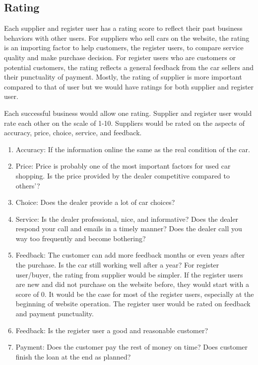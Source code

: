 \documentclass[12pt]{article}
\begin{document}
\subsection{Rating}
Each supplier and register user has a rating score to reflect their past business behaviors with other users. For suppliers who sell cars on the website, the rating is an importing factor to help customers, the register users, to compare service quality and make purchase decision. For register users who are customers or potential customers, the rating reflects a general feedback from the car sellers and their punctuality of payment. Mostly, the rating of supplier is more important compared to that of user but we would have ratings for both supplier and register user.\par
Each successful business would allow one rating. Supplier and register user would rate each other on the scale of 1-10. Suppliers would be rated on the aspects of accuracy, price, choice, service, and feedback.\par
\begin{enumerate}
\item Accuracy: If the information online the same as the real condition of the car.
\item Price: Price is probably one of the most important factors for used car shopping. Is the price provided by the dealer competitive compared to others'?
\item Choice: Does the dealer provide a lot of car choices?
\item Service: Is the dealer professional, nice, and informative? Does the dealer respond your call and emails in a timely manner? Does the dealer call you way too frequently and become bothering?
\item Feedback: The customer can add more feedback months or even years after the purchase. Is the car still working well after a year? For register user/buyer, the rating from supplier would be simpler. If the register users are new and did not purchase on the website before, they would start with a score of 0. It would be the case for most of the register users, especially at the beginning of website operation. The register user would be rated on feedback and payment punctuality.
\item Feedback: Is the register user a good and reasonable customer?
\item Payment: Does the customer pay the rest of money on time? Does customer finish the loan at the end as planned?
\end{enumerate}
\end{document}
